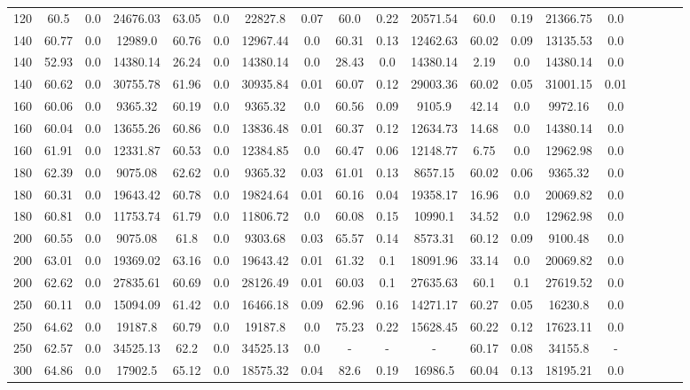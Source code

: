 \begin{sidewaystable}[!h]
\begin{tabular}{lcccccccccccccccccc}
120 & 60.5 & 0.0 & 24676.03 & 63.05 & 0.0 & 22827.8 & 0.07 & 60.0 & 0.22 & 20571.54 & 60.0 & 0.19 & 21366.75 & 0.0 \\
140 & 60.77 & 0.0 & 12989.0 & 60.76 & 0.0 & 12967.44 & 0.0 & 60.31 & 0.13 & 12462.63 & 60.02 & 0.09 & 13135.53 & 0.0 \\
140 & 52.93 & 0.0 & 14380.14 & 26.24 & 0.0 & 14380.14 & 0.0 & 28.43 & 0.0 & 14380.14 & 2.19 & 0.0 & 14380.14 & 0.0 \\
140 & 60.62 & 0.0 & 30755.78 & 61.96 & 0.0 & 30935.84 & 0.01 & 60.07 & 0.12 & 29003.36 & 60.02 & 0.05 & 31001.15 & 0.01 \\
160 & 60.06 & 0.0 & 9365.32 & 60.19 & 0.0 & 9365.32 & 0.0 & 60.56 & 0.09 & 9105.9 & 42.14 & 0.0 & 9972.16 & 0.0 \\
160 & 60.04 & 0.0 & 13655.26 & 60.86 & 0.0 & 13836.48 & 0.01 & 60.37 & 0.12 & 12634.73 & 14.68 & 0.0 & 14380.14 & 0.0 \\
160 & 61.91 & 0.0 & 12331.87 & 60.53 & 0.0 & 12384.85 & 0.0 & 60.47 & 0.06 & 12148.77 & 6.75 & 0.0 & 12962.98 & 0.0 \\
180 & 62.39 & 0.0 & 9075.08 & 62.62 & 0.0 & 9365.32 & 0.03 & 61.01 & 0.13 & 8657.15 & 60.02 & 0.06 & 9365.32 & 0.0 \\
180 & 60.31 & 0.0 & 19643.42 & 60.78 & 0.0 & 19824.64 & 0.01 & 60.16 & 0.04 & 19358.17 & 16.96 & 0.0 & 20069.82 & 0.0 \\
180 & 60.81 & 0.0 & 11753.74 & 61.79 & 0.0 & 11806.72 & 0.0 & 60.08 & 0.15 & 10990.1 & 34.52 & 0.0 & 12962.98 & 0.0 \\
200 & 60.55 & 0.0 & 9075.08 & 61.8 & 0.0 & 9303.68 & 0.03 & 65.57 & 0.14 & 8573.31 & 60.12 & 0.09 & 9100.48 & 0.0 \\
200 & 63.01 & 0.0 & 19369.02 & 63.16 & 0.0 & 19643.42 & 0.01 & 61.32 & 0.1 & 18091.96 & 33.14 & 0.0 & 20069.82 & 0.0 \\
200 & 62.62 & 0.0 & 27835.61 & 60.69 & 0.0 & 28126.49 & 0.01 & 60.03 & 0.1 & 27635.63 & 60.1 & 0.1 & 27619.52 & 0.0 \\
250 & 60.11 & 0.0 & 15094.09 & 61.42 & 0.0 & 16466.18 & 0.09 & 62.96 & 0.16 & 14271.17 & 60.27 & 0.05 & 16230.8 & 0.0 \\
250 & 64.62 & 0.0 & 19187.8 & 60.79 & 0.0 & 19187.8 & 0.0 & 75.23 & 0.22 & 15628.45 & 60.22 & 0.12 & 17623.11 & 0.0 \\
250 & 62.57 & 0.0 & 34525.13 & 62.2 & 0.0 & 34525.13 & 0.0 & - & - & - & 60.17 & 0.08 & 34155.8 &  - \\
300 & 64.86 & 0.0 & 17902.5 & 65.12 & 0.0 & 18575.32 & 0.04 & 82.6 & 0.19 & 16986.5 & 60.04 & 0.13 & 18195.21 & 0.0 \\

\end{tabular}
\end{sidewaystable}
